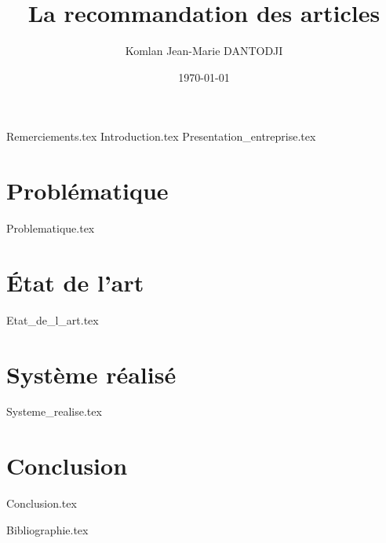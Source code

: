 \documentclass[a4paper,12pt,twoside]{book}
\author{Komlan Jean-Marie \scshape{DANTODJI}}
\title{La recommandation des articles}
\date{\today} %
\begin{document}
\fancyhead{}
\fancyhead[RO,LE]{\thepage}
\fancyhead[RE]{\textit{\leftmark}}
\fancyhead[LO]{\textit{\rightmark}}
\renewcommand{\headrulewidth}{0.4pt}

\fancyfoot{}
\fancyfoot[LE]{\theauthor}
\fancyfoot[LO]{\scshape \thetitle}

\dominitoc
\doparttoc

\pagedegarde
{}
{Remerciements.tex}
{Introduction.tex}
{Presentation_entreprise.tex}

\part{Problématique}
\parttoc
{Problematique.tex}

\part{État de l'art}
\parttoc
{Etat_de_l_art.tex}

\part{Système réalisé}
\parttoc
{Systeme_realise.tex}

\part{Conclusion}
\parttoc
{Conclusion.tex}

{Bibliographie.tex}
\newpage
~%

%
%


\listoffigures
\listoftables
\tableofcontents

\end{document}
